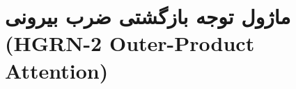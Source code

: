 \section{ماژول توجه بازگشتی ضرب بیرونی (HGRN-2 Outer-Product Attention)}
\label{sec:module_hgrn2_outer}
